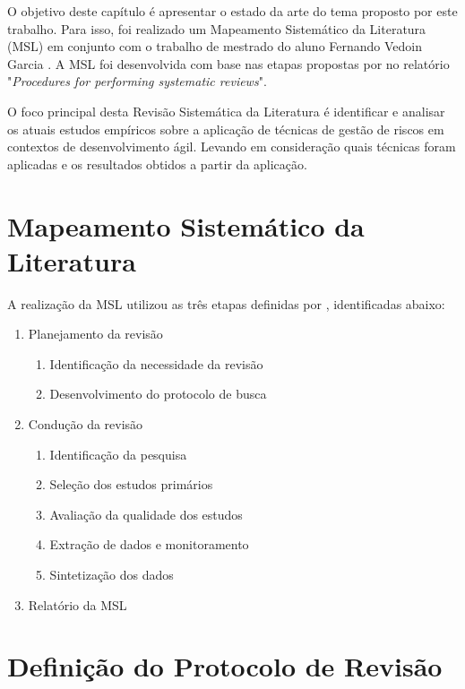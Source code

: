 \documentclass[
    12pt,       %
    openright,      %
    twoside,      %
    a4paper,      %
    english,      %
    french,       %
    spanish,      %
    brazil,       %
    ]{abntex2}
\begin{document}
O objetivo deste capítulo é apresentar o estado da arte do tema proposto por este trabalho. Para isso, foi realizado um Mapeamento Sistemático da Literatura (MSL) em conjunto com o trabalho de mestrado do aluno Fernando Vedoin Garcia \cite{GARCIA:2021}. A MSL foi desenvolvida com base nas etapas propostas por  no relatório "\textit{Procedures for performing systematic reviews}". 

O foco principal desta Revisão Sistemática da Literatura é identificar e analisar os atuais estudos empíricos sobre a aplicação de técnicas de gestão de riscos em contextos de desenvolvimento ágil. Levando em consideração quais técnicas foram aplicadas e os resultados obtidos a partir da aplicação.

\section{Mapeamento Sistemático da Literatura}

A realização da MSL utilizou as três etapas definidas por , identificadas abaixo: 

\begin{enumerate}
    \item Planejamento da revisão
        \begin{enumerate}
            \item Identificação da necessidade da revisão
            \item Desenvolvimento do protocolo de busca
        \end{enumerate}
    \item Condução da revisão
        \begin{enumerate}
            \item Identificação da pesquisa
            \item Seleção dos estudos primários
            \item Avaliação da qualidade dos estudos
            \item Extração de dados e monitoramento
            \item Sintetização dos dados
        \end{enumerate}
    \item Relatório da MSL
\end{enumerate}

\section{Definição do Protocolo de Revisão}
\end{document}

